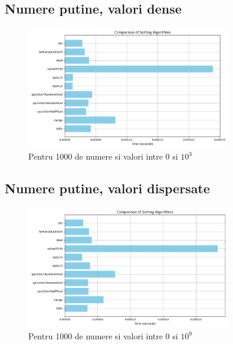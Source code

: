 \documentclass[12pt]{article}
\begin{document}
\subsection{Numere putine, valori dense}
\begin{figure}[H]
    \centering
    \includegraphics[width=0.8\textwidth]{./img/img_20250417_022149.png} %
    \caption{Pentru 1000 de numere si valori intre 0 si $10^3$}
\end{figure}
\subsection{Numere putine, valori dispersate}
\begin{figure}[H]
    \centering
    \includegraphics[width=0.8\textwidth]{./img/img_20250417_022311.png} %
    \caption{Pentru 1000 de numere si valori intre 0 si $10^9$}
\end{figure}
\end{document}
